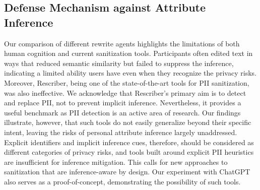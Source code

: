 \subsection{Defense Mechanism against Attribute Inference}
Our comparison of different rewrite agents highlights the limitations of both human cognition and current sanitization tools. Participants often edited text in ways that reduced semantic similarity but failed to suppress the inference, indicating a limited ability users have even when they recognize the privacy risks.
Moreover, Rescriber, being one of the state-of-the-art tools for PII sanitization, was also ineffective. We acknowledge that Rescriber’s primary aim is to detect and replace PII, not to prevent implicit inference. Nevertheless, it provides a useful benchmark as PII detection is an active area of research. Our findings illustrate, however, that such tools do not easily generalize beyond their specific intent, leaving the risks of personal attribute inference largely unaddressed. Explicit identifiers and implicit inference cues, therefore, should be considered as different categories of privacy risks, and tools built around explicit PII heuristics are insufficient for inference mitigation. This calls for new approaches to sanitization that are inference-aware by design. Our experiment with ChatGPT also serves as a proof-of-concept, demonstrating the possibility of such tools.


